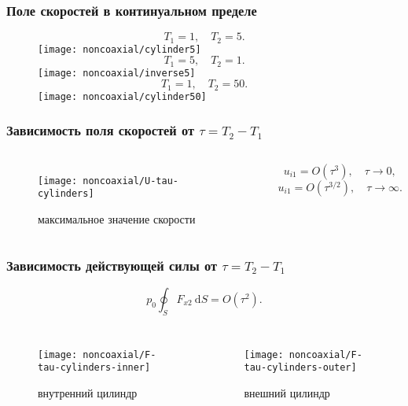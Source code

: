\documentclass[mathserif]{beamer} %
\newcommand{\dd}{\:\mathrm{d}}
\newcommand{\OO}[1]{O(#1)}
\begin{document}
\begin{frame}
    \frametitle{Поле скоростей в континуальном пределе}
    \centering
    \begin{figure}
    \begin{overprint}
            \[ T_1 = 1, \quad T_2 = 5.\]
            \hspace{-1cm}
            \texttt{[image: noncoaxial/cylinder5]}
            \[ T_1 = 5, \quad T_2 = 1.\]
            \hspace{-1cm}
            \texttt{[image: noncoaxial/inverse5]}
            \[ T_1 = 1, \quad T_2 = 50.\]
            \hspace{-1cm}
            \texttt{[image: noncoaxial/cylinder50]}
    \end{overprint}
    \hspace{-.5cm}
    \end{figure}
\end{frame}

\begin{frame}
    \frametitle{Зависимость поля скоростей от \(\tau = T_2-T_1\)}
    \centering
    \begin{columns}
        \begin{figure}
            \texttt{[image: noncoaxial/U-tau-cylinders]}
            \vspace{-.5cm}\caption{максимальное значение скорости}
        \end{figure}
        \[ u_{i1} = \OO{\tau^3}, \quad \tau\to0, \]
        \[ u_{i1} = \OO{\tau^{3/2}}, \quad \tau\to\infty. \]
    \end{columns}
\end{frame}

\begin{frame}
    \frametitle{Зависимость действующей силы от \(\tau = T_2-T_1\)}
    \vspace{-.2cm}
    \[ p_0 \oint_S F_{x2}\dd{S} = \OO{\tau^2}. \]
    \vspace{-.7cm}
    \begin{columns}
        \begin{figure}
            \texttt{[image: noncoaxial/F-tau-cylinders-inner]}
            \vspace{-.5cm}\caption{внутренний цилиндр}
        \end{figure}
        \begin{figure}
            \texttt{[image: noncoaxial/F-tau-cylinders-outer]}
            \vspace{-.5cm}\caption{внешний цилиндр}
        \end{figure}
    \end{columns}
\end{frame}
\end{document}

